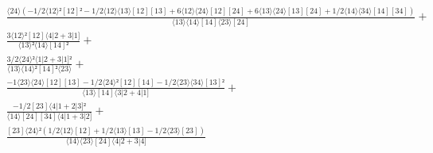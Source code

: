 \documentclass[varwidth, border=5pt]{standalone}
\begin{document}
\begin{my}
$\begin{gathered}
\scriptscriptstyle\frac{⟨24⟩(-1/2⟨12⟩²[12]²-1/2⟨12⟩⟨13⟩[12][13]+6⟨12⟩⟨24⟩[12][24]+6⟨13⟩⟨24⟩[13][24]+1/2⟨14⟩⟨34⟩[14][34])}{⟨13⟩⟨14⟩[14]⟨23⟩[24]} +\\
\scriptscriptstyle\frac{3⟨12⟩²[12]⟨4|2+3|1]}{⟨13⟩²⟨14⟩[14]²} +\\
\scriptscriptstyle\frac{3/2⟨24⟩²⟨1|2+3|1]²}{⟨13⟩⟨14⟩²[14]²⟨23⟩} +\\
\scriptscriptstyle\frac{-1⟨23⟩⟨24⟩[12][13]-1/2⟨24⟩²[12][14]-1/2⟨23⟩⟨34⟩[13]²}{⟨13⟩[14]⟨3|2+4|1]} +\\
\scriptscriptstyle\frac{-1/2[23]⟨4|1+2|3]²}{⟨14⟩[24][34]⟨4|1+3|2]} +\\
\scriptscriptstyle\frac{[23]⟨24⟩²(1/2⟨12⟩[12]+1/2⟨13⟩[13]-1/2⟨23⟩[23])}{⟨14⟩⟨23⟩[24]⟨4|2+3|4]} \phantom{+}
\end{gathered}$
\end{my}
\end{document}
